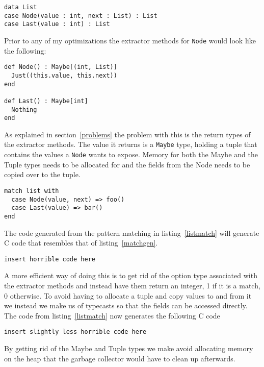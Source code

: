 \documentclass[10pt]{report}
\def\code#1{\texttt{#1}} %
\begin{document}
{\begin{lstlisting}[language=encore]
data List
case Node(value : int, next : List) : List
case Last(value : int) : List
\end{lstlisting}

\par{Prior to any of my optimizations the extractor methods for \code{Node} would look like the following:}

\begin{lstlisting}[language=encore,caption={Extractor methods before optimization}]
def Node() : Maybe[(int, List)]
  Just((this.value, this.next))
end

def Last() : Maybe[int]
  Nothing
end
\end{lstlisting}

\par{As explained in section~\ref{problems} the problem with this is the return types of the extractor methods. The value it returns is a \code{Maybe} type, holding a tuple that contains the values a \code{Node} wants to expose. Memory for both the Maybe and the Tuple types needs to be allocated for and the fields from the Node needs to be copied over to the tuple.}


\begin{lstlisting}[language=encore,caption={Pattern matching on a List},label=listmatch]
match list with
  case Node(value, next) => foo()
  case Last(value) => bar()
end
\end{lstlisting}

\par{The code generated from the pattern matching in listing~\ref{listmatch} will generate C code that resembles that of listing~\ref{matchgen}.}


\begin{lstlisting}[language=encore,caption={Pattern matching on a List},label=matchgen]
  insert horrible code here
\end{lstlisting}

\par{A more efficient way of doing this is to get rid of the option type associated with the extractor methods and instead have them return an integer, 1 if it is a match, 0 otherwise. To avoid having to allocate a tuple and copy values to and from it we instead we make us of typecasts so that the fields can be accessed directly. The code from listing~\ref{listmatch} now generates the following C code}

\begin{lstlisting}[language=encore,caption={Pattern matching on a List},label=matchgen2]
  insert slightly less horrible code here
\end{lstlisting}
\par{By getting rid of the Maybe and Tuple types we make avoid allocating memory on the heap that the garbage collector would have to clean up afterwards.}
}
\end{document}
